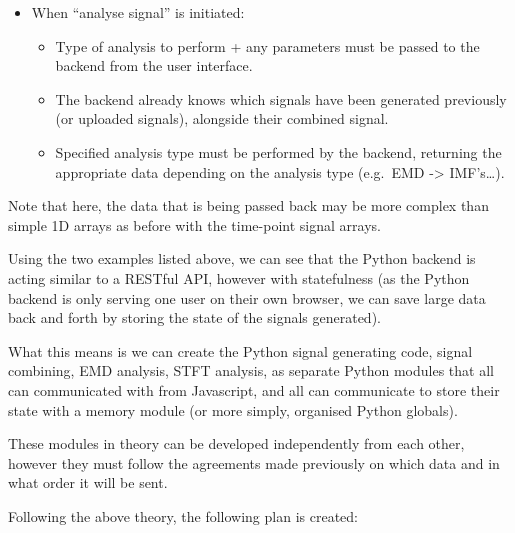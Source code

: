 \documentclass[
  paper=a4,
  ,captions=tableheading
]{scrartcl}
\providecommand{\tightlist}{%
  \setlength{\itemsep}{0pt}\setlength{\parskip}{0pt}}
\begin{document}
\begin{itemize}
\tightlist
\item
  When ``analyse signal'' is initiated:

  \begin{itemize}
  \tightlist
  \item
    Type of analysis to perform + any parameters must be passed to the
    backend from the user interface.
  \item
    The backend already knows which signals have been generated
    previously (or uploaded signals), alongside their combined signal.
  \item
    Specified analysis type must be performed by the backend, returning
    the appropriate data depending on the analysis type (e.g.~EMD
    -\textgreater{} IMF's\ldots).
  \end{itemize}
\end{itemize}

Note that here, the data that is being passed back may be more complex
than simple 1D arrays as before with the time-point signal arrays.

Using the two examples listed above, we can see that the Python backend
is acting similar to a RESTful API, however with statefulness (as the
Python backend is only serving one user on their own browser, we can
save large data back and forth by storing the state of the signals
generated).

What this means is we can create the Python signal generating code,
signal combining, EMD analysis, STFT analysis, as separate Python
modules that all can communicated with from Javascript, and all can
communicate to store their state with a memory module (or more simply,
organised Python globals).

These modules in theory can be developed independently from each other,
however they must follow the agreements made previously on which data
and in what order it will be sent.

Following the above theory, the following plan is created:
\end{document}
